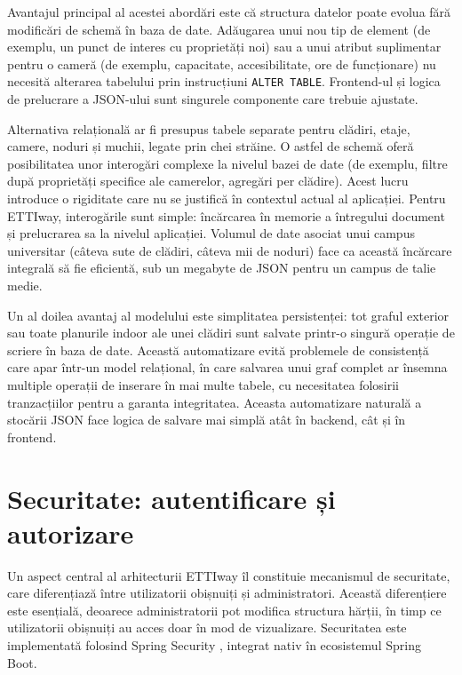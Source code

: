 Avantajul principal al acestei abordări este că structura datelor poate evolua
fără modificări de schemă în baza de date. Adăugarea unui nou tip de element
(de exemplu, un punct de interes cu proprietăți noi) sau a unui atribut
suplimentar pentru o cameră (de exemplu, capacitate, accesibilitate, ore de
funcționare) nu necesită alterarea tabelului prin instrucțiuni
\texttt{ALTER TABLE}. Frontend-ul și logica de
prelucrare a JSON-ului sunt singurele componente care trebuie ajustate.
 
Alternativa relațională ar fi presupus tabele separate pentru clădiri, etaje,
camere, noduri și muchii, legate prin chei străine. O astfel de schemă oferă
posibilitatea unor interogări complexe la nivelul bazei de date (de exemplu,
filtre după proprietăți specifice ale camerelor, agregări per clădire). Acest lucru
introduce o rigiditate care nu se justifică în contextul actual al aplicației.
Pentru ETTIway, interogările sunt simple: încărcarea în memorie a întregului
document și prelucrarea sa la nivelul aplicației. Volumul de date asociat unui
campus universitar (câteva sute de clădiri, câteva mii de noduri) face ca
această încărcare integrală să fie eficientă, sub un megabyte de JSON pentru un
campus de talie medie.
 
Un al doilea avantaj al modelului este simplitatea persistenței: tot graful
exterior sau toate planurile indoor ale unei clădiri sunt salvate printr-o
singură operație de scriere în baza de date. Această automatizare evită
problemele de consistență care apar într-un model relațional, în care
salvarea unui graf complet ar însemna multiple operații de inserare în mai
multe tabele, cu necesitatea folosirii tranzacțiilor pentru a garanta
integritatea. Aceasta automatizare naturală a stocării JSON face logica de salvare
mai simplă atât în backend, cât și în frontend.
 


\section{Securitate: autentificare și autorizare}
\label{sec:securitate}

Un aspect central al arhitecturii ETTIway îl constituie mecanismul de
securitate, care diferențiază între utilizatorii obișnuiți și administratori.
Această diferențiere este esențială, deoarece administratorii pot modifica
structura hărții, în timp ce utilizatorii obișnuiți au acces doar în mod de
vizualizare. Securitatea este implementată folosind Spring Security
\cite{SpringSecurity}, integrat nativ în ecosistemul Spring Boot.

